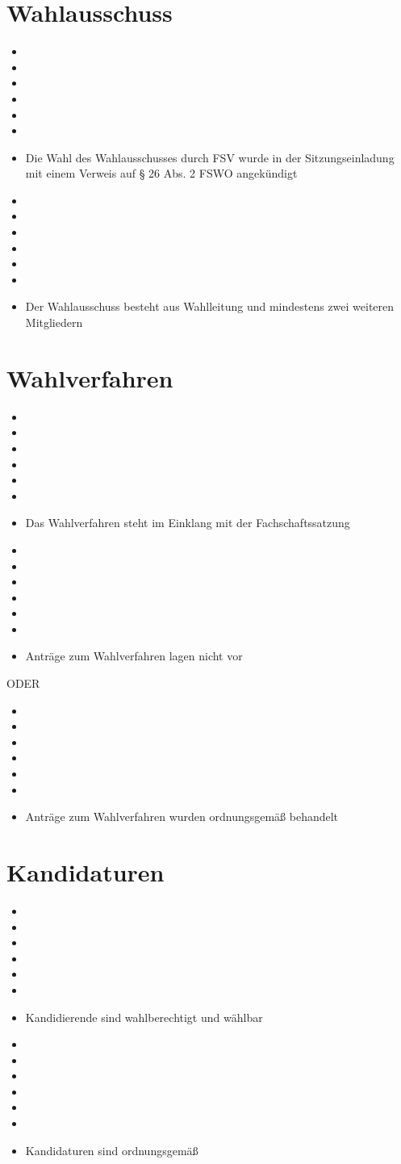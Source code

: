 \documentclass[a4paper]{scrartcl}
\newcommand{\fullcheck}{\raisebox{-.8\dp\strutbox}{\texttt{[image: Check.pdf]}}}
\newcommand{\semicheck}{\raisebox{-.8\dp\strutbox}{\texttt{[image: Semicheck.pdf]}}}
\newcommand{\nocheck}{\raisebox{-.8\dp\strutbox}{\texttt{[image: Nocheck.pdf]}}}
\newcommand{\dontknow}{\raisebox{-.8\dp\strutbox}{\texttt{[image: Dontknow.pdf]}}}
\newcommand{\notrev}{\raisebox{-.8\dp\strutbox}{\texttt{[image: Notrev.pdf]}}}
\newcommand{\sym}[1]{
\ifcase#1 \item[$\Box$]
\or \item[\fullcheck]
\or \item[\semicheck]
\or \item[\nocheck]
\or \item[\dontknow]
\or \item[\notrev]
\else \item[$\Box$]
\fi}
\begin{document}






\section{Wahlausschuss}
\begin{itemize}[label=$\Box$]
	\sym{3} Die Wahl des Wahlausschusses durch FSV wurde in der Sitzungseinladung mit einem Verweis auf § 26 Abs. 2 FSWO angekündigt
	\sym{1} Der Wahlausschuss besteht aus Wahlleitung und mindestens zwei weiteren Mitgliedern
\end{itemize}

\section{Wahlverfahren}
\begin{itemize}[label=$\Box$]
	\sym{1} Das Wahlverfahren steht im Einklang mit der Fachschaftssatzung
	\sym{4} Anträge zum Wahlverfahren lagen nicht vor
\end{itemize}
ODER
\begin{itemize}[label=$\Box$]	
	\sym{0} Anträge zum Wahlverfahren wurden ordnungsgemäß behandelt
\end{itemize}

\section{Kandidaturen}
\begin{itemize}[label=$\Box$]
\sym{4} Kandidierende sind wahlberechtigt und wählbar
\sym{4} Kandidaturen sind ordnungsgemäß
\end{itemize}

\end{document}
